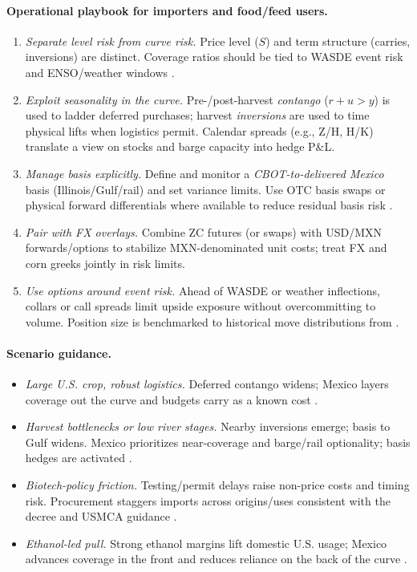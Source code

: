 \documentclass[11pt,a4paper]{article} %
\begin{document}
\paragraph{Operational playbook for importers and food/feed users.}
\begin{enumerate}
  \item \textit{Separate level risk from curve risk.} Price level (\(S\)) and term structure (carries, inversions) are distinct. Coverage ratios should be tied to WASDE event risk and ENSO/weather windows \citep{noaa_enso_discussion,usda_wasde}.
  \item \textit{Exploit seasonality in the curve.} Pre-/post-harvest \emph{contango} (\(r+u>y\)) is used to ladder deferred purchases; harvest \emph{inversions} are used to time physical lifts when logistics permit. Calendar spreads (e.g., Z/H, H/K) translate a view on stocks and barge capacity into hedge P\&L.
  \item \textit{Manage basis explicitly.} Define and monitor a \emph{CBOT-to-delivered Mexico} basis (Illinois/Gulf/rail) and set variance limits. Use OTC basis swaps or physical forward differentials where available to reduce residual basis risk \citep{ams_gtr_2023}.
  \item \textit{Pair with FX overlays.} Combine ZC futures (or swaps) with USD/MXN forwards/options to stabilize MXN-denominated unit costs; treat FX and corn greeks jointly in risk limits.
  \item \textit{Use options around event risk.} Ahead of WASDE or weather inflections, collars or call spreads limit upside exposure without overcommitting to volume. Position size is benchmarked to historical move distributions from \citep{usda_wasde}.
\end{enumerate}

\paragraph{Scenario guidance.}
\begin{itemize}
  \item \textit{Large U.S. crop, robust logistics.} Deferred contango widens; Mexico layers coverage out the curve and budgets carry as a known cost \citep{ers_feedgrains_outlook,reuters_record_crop_2025}.
  \item \textit{Harvest bottlenecks or low river stages.} Nearby inversions emerge; basis to Gulf widens. Mexico prioritizes near-coverage and barge/rail optionality; basis hedges are activated \citep{ams_gtr_2023}.
  \item \textit{Biotech-policy friction.} Testing/permit delays raise non-price costs and timing risk. Procurement staggers imports across origins/uses consistent with the decree and USMCA guidance \citep{fas_mexico_decree_2023,ustr_usmca_biotech_win_2024,fas_mexico_grain_annual_2025}.
  \item \textit{Ethanol-led pull.} Strong ethanol margins lift domestic U.S. usage; Mexico advances coverage in the front and reduces reliance on the back of the curve \citep{ers_ethanol_40}.
\end{itemize}
\end{document}
